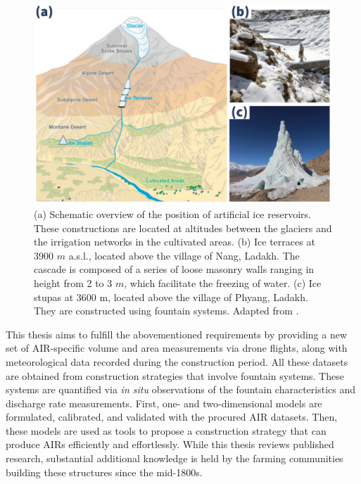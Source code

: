 \begin{figure}[t]
	\centering
	\includegraphics[width=\textwidth]{figs/AIR_forms.jpg}

	\caption{ (a) Schematic overview of the position of artificial ice reservoirs. These constructions are located at
		altitudes between the glaciers and the irrigation networks in the cultivated areas. (b) Ice terraces at 3900
		$m$ \ac{a.s.l.}, located above the village of Nang, Ladakh. The cascade is composed of a series of loose masonry walls
		ranging in height from 2 to 3 $m$, which facilitate the freezing of water. (c) Ice stupas at 3600 m, located
		above the village of Phyang, Ladakh. They are constructed using fountain systems. Adapted from \citet{nusserLocalKnowledgeGlobal2016}. }

	\label{fig:AIRforms}
\end{figure}

This thesis aims to fulfill the abovementioned requirements by providing a new set of \ac{AIR}-specific volume
and area measurements via drone flights, along with meteorological data recorded during the construction period.
All these datasets are obtained from construction strategies that involve fountain systems. These systems are
quantified via \textit{in situ} observations of the fountain characteristics and discharge rate measurements.
First, one- and two-dimensional models are formulated, calibrated, and validated with the procured \ac{AIR}
datasets. Then, these models are used as tools to propose a construction strategy that can produce \ac{AIRs}
efficiently and effortlessly. While this thesis reviews published research, substantial additional knowledge is
held by the farming communities building these structures since the mid-1800s.



